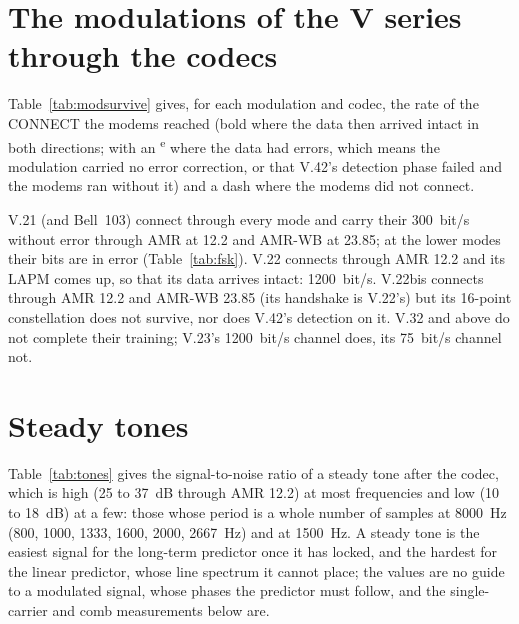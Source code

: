 \section{The modulations of the V series through the codecs}
Table~\ref{tab:modsurvive} gives, for each modulation and codec, the rate
of the CONNECT the modems reached (bold where the data then arrived
intact in both directions; with an \textsuperscript{e} where the data had
errors, which means the modulation carried no error correction, or that
V.42's detection phase failed and the modems ran without it) and a dash
where the modems did not connect.
\begin{table}[htbp]
\caption{D-Modem's modulations through the codecs: CONNECT rate (bold: data intact; e: data in error; --: no connection)}
\label{tab:modsurvive}
\centering\footnotesize
\resizebox{\textwidth}{!}{\tabmodsurvive}
\end{table}
V.21 (and Bell~103) connect through every mode and carry their 300~bit/s
without error through AMR at 12.2 and AMR-WB at 23.85; at the lower modes
their bits are in error (Table~\ref{tab:fsk}).  V.22 connects through AMR
12.2 and its LAPM comes up, so that its data arrives intact: 1200~bit/s.
V.22bis connects through AMR 12.2 and AMR-WB 23.85 (its handshake is
V.22's) but its 16-point constellation does not survive, nor does V.42's
detection on it.  V.32 and above do not complete their training; V.23's
1200~bit/s channel does, its 75~bit/s channel not.

\begin{table}[htbp]
\caption{Bit error ratio of 300~bit/s FSK through the codecs (8000~Hz interface)}
\label{tab:fsk}
\centering\small
\tabfsk
\end{table}

\section{Steady tones}
Table~\ref{tab:tones} gives the signal-to-noise ratio of a steady tone
after the codec, which is high (25 to 37~dB through AMR 12.2) at most
frequencies and low (10 to 18~dB) at a few: those whose period is a whole
number of samples at 8000~Hz (800, 1000, 1333, 1600, 2000, 2667~Hz) and
at 1500~Hz.  A steady tone is the easiest signal for the long-term
predictor once it has locked, and the hardest for the linear predictor,
whose line spectrum it cannot place; the values are no guide to a
modulated signal, whose phases the predictor must follow, and the
single-carrier and comb measurements below are.
\begin{table}[htbp]
\caption{SNR (dB) of a steady tone at $-12$~dBFS after the codec, by frequency (Hz)}
\label{tab:tones}
\centering\footnotesize
\resizebox{\textwidth}{!}{\tabtones}
\end{table}

